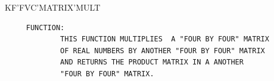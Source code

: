 \begin{frame}
KF'FVC'MATRIX'MULT
\begin{verbatim}
     FUNCTION:
             THIS FUNCTION MULTIPLIES  A "FOUR BY FOUR" MATRIX
             OF REAL NUMBERS BY ANOTHER "FOUR BY FOUR" MATRIX
             AND RETURNS THE PRODUCT MATRIX IN A ANOTHER
             "FOUR BY FOUR" MATRIX.

\end{verbatim}
\end{frame}
